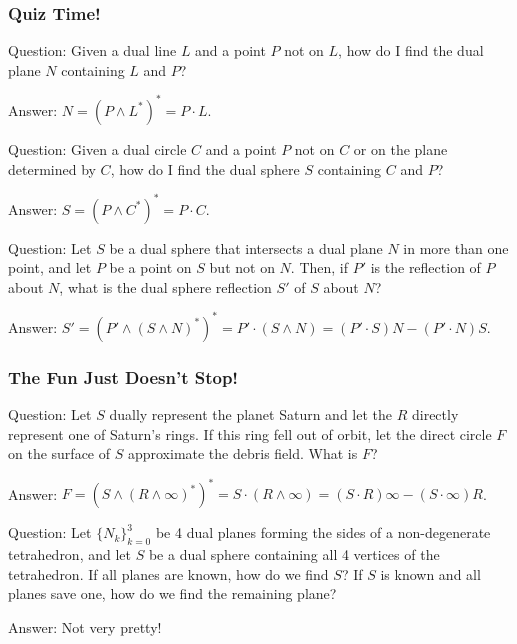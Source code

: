 \documentclass{beamer}
\newcommand{\nvai}{\infty}
\begin{document}
\begin{frame}
\frametitle{Quiz Time!}
\alert{Question}: Given a \alert{dual} line $L$ and a point $P$ not on $L$,
how do I find the \alert{dual} plane $N$ containing $L$ and $P$?\pause

\alert{Answer}: $N = (P\wedge L^*)^* = P\cdot L$.\pause

\alert{Question}: Given a \alert{dual} circle $C$ and a point $P$ not on $C$ or on
the plane determined by $C$, how do I find the \alert{dual} sphere $S$ containing $C$ and $P$?\pause

\alert{Answer}: $S = (P\wedge C^*)^* = P\cdot C$.\pause

\alert{Question}: Let $S$ be a \alert{dual} sphere that intersects a \alert{dual} plane $N$ in more than one point, and let $P$ be a point on $S$ but not on $N$.  Then, if $P'$ is the reflection of $P$ about $N$, what is the \alert{dual} sphere reflection $S'$ of $S$ about $N$?\pause

\alert{Answer}: $S' = (P'\wedge(S\wedge N)^*)^* = P'\cdot(S\wedge N) = (P'\cdot S)N - (P'\cdot N)S$.
\end{frame}

\begin{frame}
\frametitle{The Fun Just Doesn't Stop!}
\alert{Question}: Let $S$ \alert{dually} represent the planet Saturn and let the $R$ \alert{directly} represent
one of Saturn's rings.  If this ring fell out of orbit, let the \alert{direct} circle $F$ on the surface of $S$ approximate
the debris field.  What is $F$?\pause

\alert{Answer}: $F = (S\wedge (R\wedge\nvai)^*)^* = S\cdot (R\wedge\nvai) = (S\cdot R)\nvai - (S\cdot\nvai)R$.\pause

\alert{Question}: Let $\{N_k\}_{k=0}^3$ be 4 \alert{dual} planes forming the sides of
a non-degenerate tetrahedron, and let $S$ be a \alert{dual} sphere containing all
4 vertices of the tetrahedron.  If all planes are known, how do we find $S$?
If $S$ is known and all planes save one, how do we find the remaining plane?\pause

\alert{Answer}: Not very pretty!

\end{frame}
\end{document}
